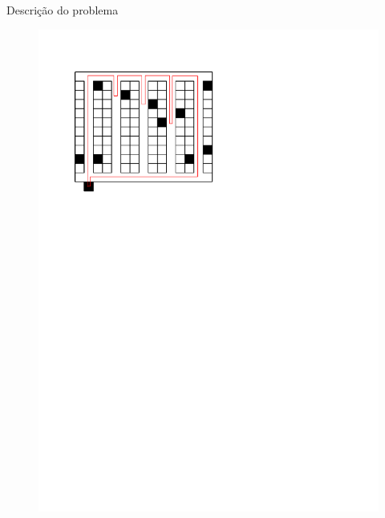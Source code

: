 \documentclass[12pt]{beamer}
\begin{document}
\begin{frame}{Descri\c{c}\~ao do problema}
\begin{minipage}[t]{0.60\linewidth}
	\end{minipage}%
	\hfill%
	{%
		\begin{minipage}[t]{0.35\linewidth}
			\pause
			\begin{figure}			
				\includegraphics[width=0.9\linewidth]{rota_sprp}
			\end{figure}
		    \pause
			\begin{figure}			

\end{figure}
\end{minipage}}
\end{frame}
\end{document}
